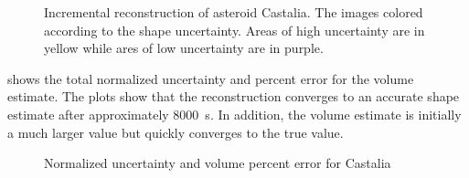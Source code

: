 \begin{figure}[htbp]
    \caption[Asteroid Castalia shape reconstruction with uncertainty]{Incremental reconstruction of asteroid Castalia. The images colored according to the shape uncertainty. Areas of high uncertainty are in yellow while ares of low uncertainty are in purple.~\label{fig:castalia_weights_reconstruction}}
\end{figure}

 shows the total normalized uncertainty and percent error for the volume estimate. 
The plots show that the reconstruction converges to an accurate shape estimate after approximately \SI{8000}{\second}.
In addition, the volume estimate is initially a much larger value but quickly converges to the true value.
\begin{figure}[htbp]
    \centering
    
    \caption{Normalized uncertainty and volume percent error for Castalia\label{fig:castalia_metrics}}
\end{figure}

